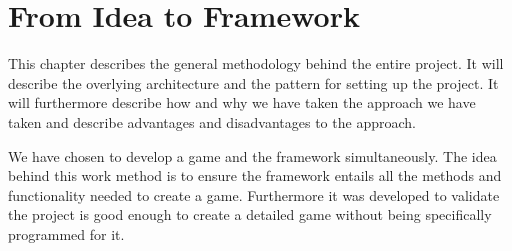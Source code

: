 \chapter{From Idea to Framework}

This chapter describes the general methodology behind the entire project. It will describe the overlying architecture and the pattern for setting up the project. It will furthermore describe how and why we have taken the approach we have taken and describe advantages and disadvantages to the approach. 

We have chosen to develop a game and the framework simultaneously. The idea behind this work method is to ensure the framework entails all the methods and functionality needed to create a game. Furthermore it was developed to validate the project is good enough to create a detailed game without being specifically programmed for it.


